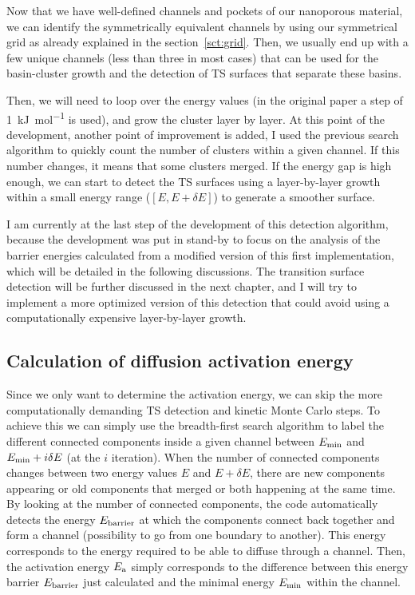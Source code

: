 \documentclass[main]{subfiles}
\begin{document}
Now that we have well-defined channels and pockets of our nanoporous material, we can identify the symmetrically equivalent channels by using our symmetrical grid as already explained in the section~\ref{sct:grid}. Then, we usually end up with a few unique channels (less than three in most cases) that can be used for the basin-cluster growth and the detection of TS surfaces that separate these basins. 

Then, we will need to loop over the energy values (in the original paper a step of \SI{1}{\kJ\per\mole} is used), and grow the cluster layer by layer. At this point of the development, another point of improvement is added, I used the previous search algorithm to quickly count the number of clusters within a given channel. If this number changes, it means that some clusters merged. If the energy gap is high enough, we can start to detect the TS surfaces using a layer-by-layer growth within a small energy range ($[E,E+\delta E]$) to generate a smoother surface. 

I am currently at the last step of the development of this detection algorithm, because the development was put in stand-by to focus on the analysis of the barrier energies calculated from a modified version of this first implementation, which will be detailed in the following discussions. The transition surface detection will be further discussed in the next chapter, and I will try to implement a more optimized version of this detection that could avoid using a computationally expensive layer-by-layer growth. 

\subsection{Calculation of diffusion activation energy}

Since we only want to determine the activation energy, we can skip the more computationally demanding TS detection and kinetic Monte Carlo steps. To achieve this we can simply use the breadth-first search algorithm to label the different connected components inside a given channel between $E_{\text{min}}$ and $E_{\text{min}}+i\delta E$ (at the $i$ iteration). When the number of connected components changes between two energy values $E$ and $E+\delta E$, there are new components appearing or old components that merged or both happening at the same time. By looking at the number of connected components, the code automatically detects the energy $E_{\text{barrier}}$ at which the components connect back together and form a channel (possibility to go from one boundary to another). This energy corresponds to the energy required to be able to diffuse through a channel. Then, the activation energy $E_{\text{a}}$ simply corresponds to the difference between this energy barrier $E_{\text{barrier}}$ just calculated and the minimal energy $E_{\text{min}}$ within the channel. 
\end{document}

